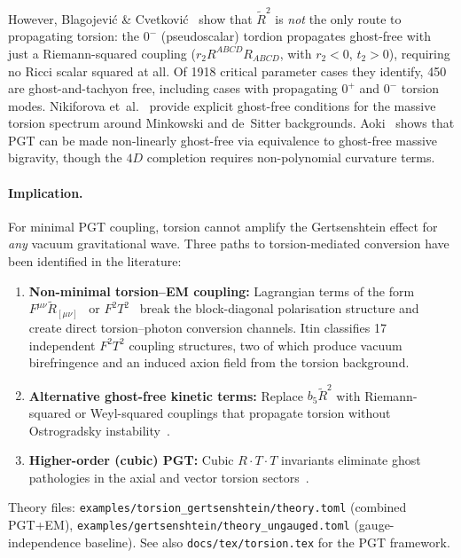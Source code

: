 However, Blagojevi\'{c} \& Cvetkovi\'{c}~\cite{blagojevic2018ghost} show that
$\widetilde{R}^2$ is \emph{not} the only route to propagating torsion: the $0^-$
(pseudoscalar) tordion propagates ghost-free with just a Riemann-squared coupling
($r_2 R^{ABCD}R_{ABCD}$, with $r_2 < 0$, $t_2 > 0$), requiring no Ricci scalar
squared at all.  Of 1918 critical parameter cases they identify, 450 are
ghost-and-tachyon free, including cases with propagating $0^+$ and $0^-$ torsion
modes.  Nikiforova et~al.~\cite{nikiforova2009torsion} provide explicit ghost-free
conditions for the massive torsion spectrum around Minkowski and de~Sitter backgrounds.
Aoki~\cite{aoki2020ghostfree} shows that PGT can be made non-linearly ghost-free
via equivalence to ghost-free massive bigravity, though the $4D$ completion requires
non-polynomial curvature terms.

\paragraph{Implication.}
For minimal PGT coupling, torsion cannot amplify the Gertsenshtein effect for
\emph{any} vacuum gravitational wave.  Three paths to torsion-mediated conversion
have been identified in the literature:
\begin{enumerate}
  \item \textbf{Non-minimal torsion--EM coupling:} Lagrangian terms of the form
    $F^{\mu\nu}\widetilde{R}_{[\mu\nu]}$~\cite{bahamonde2025torsion} or
    $F^2 T^2$~\cite{itin2003maxwell,rubilar2003torsion} break the block-diagonal
    polarisation structure and create direct torsion--photon conversion channels.
    Itin classifies 17 independent $F^2 T^2$ coupling structures, two of which
    produce vacuum birefringence and an induced axion field from the torsion
    background.
  \item \textbf{Alternative ghost-free kinetic terms:} Replace $b_5\widetilde{R}^2$
    with Riemann-squared or Weyl-squared couplings that propagate torsion without
    Ostrogradsky instability~\cite{blagojevic2018ghost}.
  \item \textbf{Higher-order (cubic) PGT:} Cubic $R \cdot T \cdot T$ invariants
    eliminate ghost pathologies in the axial and vector torsion
    sectors~\cite{bahamonde2025cubic}.
\end{enumerate}

Theory files: \texttt{examples/torsion\_gertsenshtein/theory.toml} (combined
PGT+EM), \texttt{examples/gertsenshtein/theory\_ungauged.toml} (gauge-independence
baseline).  See also \texttt{docs/tex/torsion.tex} for the PGT framework.

